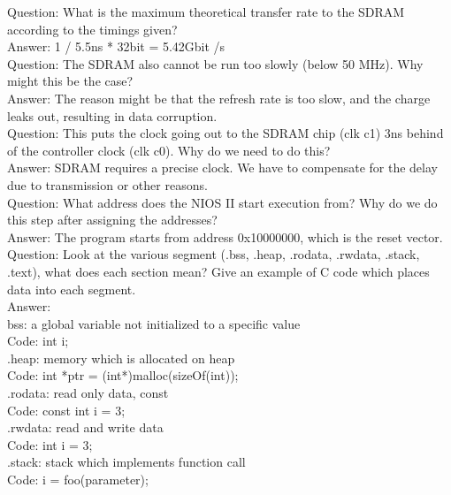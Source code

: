 \documentclass[12pt]{article}
\begin{document}
Question: What is the maximum theoretical transfer rate to the SDRAM according to the timings given? \\

Answer: 1 / 5.5ns * 32bit = 5.42Gbit /s \\

Question: The SDRAM also cannot be run too slowly (below 50 MHz). Why might this be the case? \\

Answer: The reason might be that the refresh rate is too slow, and the charge leaks out, resulting in data corruption. \\

Question: This puts the clock going out to the SDRAM chip (clk c1) 3ns behind of the controller clock (clk c0). Why do we need to do this? \\

Answer: SDRAM requires a precise clock. We have to compensate for the delay due to transmission or other reasons. \\

Question: What address does the NIOS II start execution from? Why do we do this step after assigning the addresses? \\

Answer: The program starts from address 0x10000000, which is the reset vector. \\

Question: Look at the various segment (.bss, .heap, .rodata, .rwdata, .stack, .text), what does each section mean? Give an example of C code which places data into each segment. \\


Answer: \\
bss:		a global variable not initialized to a specific value \\
Code:		int i; \\

.heap:		memory which is allocated on heap \\
Code:		int *ptr = (int*)malloc(sizeOf(int)); \\

.rodata: 	read only data, const \\
Code:		const int i = 3; \\

.rwdata:	read and write data \\
Code:		int i = 3; \\


.stack:		stack which implements function call \\
Code:		i = foo(parameter); \\
\end{document}
